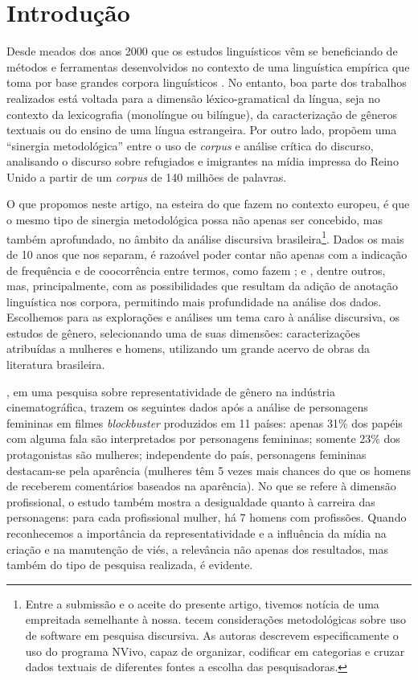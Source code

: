 \documentclass[portuguese]{textolivre}
\begin{document}
\section{Introdução}\label{sec-intro}
Desde meados dos anos 2000 que os estudos linguísticos vêm se beneficiando de métodos e ferramentas desenvolvidos no contexto de uma linguística empírica que toma por base grandes corpora linguísticos \cite{sampson2002, santos2008, mcenery2011, finatto2018}. No entanto, boa parte dos trabalhos realizados está voltada para a dimensão léxico-gramatical da língua, seja no contexto da lexicografia (monolíngue ou bilíngue), da caracterização de gêneros textuais ou do ensino de uma língua estrangeira. Por outro lado, \textcite{baker2008} propõem uma “sinergia metodológica” entre o uso de \textit{corpus} e análise crítica do discurso, analisando o discurso sobre refugiados e imigrantes na mídia impressa do Reino Unido a partir de um \textit{corpus} de 140 milhões de palavras.  

O que propomos neste artigo, na esteira do que fazem \textcite{baker2008} no contexto europeu, é que o mesmo tipo de sinergia metodológica possa não apenas ser concebido, mas também aprofundado, no âmbito da análise discursiva brasileira\footnote{Entre a submissão e o aceite do presente artigo, tivemos notícia de uma empreitada semelhante à nossa. \textcite{ramalho2021} tecem considerações metodológicas sobre uso de software em pesquisa discursiva. As autoras descrevem especificamente o uso do programa NVivo, capaz de organizar, codificar em categorias e cruzar dados textuais de diferentes fontes a escolha das pesquisadoras.}. Dados os mais de 10 anos que nos separam, é razoável poder contar não apenas com a indicação de frequência e de coocorrência entre termos, como fazem \textcite{baker2008, baker2013}; \textcite{strom2017} e \textcite{friginal2020}, dentre outros, mas, principalmente, com as possibilidades que resultam da adição de anotação linguística nos corpora, permitindo mais profundidade na análise dos dados. Escolhemos para as explorações e análises um tema caro à análise discursiva, os estudos de gênero, selecionando uma de suas dimensões: caracterizações atribuídas a mulheres e homens, utilizando um grande acervo de obras da literatura brasileira.

\textcite{smith2014}, em uma pesquisa sobre representatividade de gênero na indústria cinematográfica, trazem os seguintes dados após a análise de personagens femininas em filmes \textit{blockbuster} produzidos em 11 países: apenas 31\% dos papéis com alguma fala são interpretados por personagens femininas; somente 23\% dos protagonistas são mulheres; independente do país, personagens femininas destacam-se pela aparência (mulheres têm 5 vezes mais chances do que os homens de receberem comentários baseados na aparência). No que se refere à dimensão profissional, o estudo também mostra a desigualdade quanto à carreira das personagens: para cada profissional mulher, há 7 homens com profissões. Quando reconhecemos a importância da representatividade e a influência da mídia na criação e na manutenção de viés, a relevância não apenas dos resultados, mas também do tipo de pesquisa realizada, é evidente.
\end{document}
